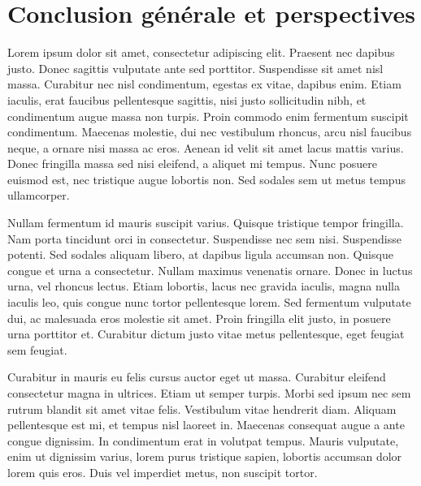 \chapter*{Conclusion générale et perspectives}




\label{chap:General Conclusion} 

Lorem ipsum dolor sit amet, consectetur adipiscing elit. Praesent nec dapibus justo. Donec sagittis vulputate ante sed porttitor. Suspendisse sit amet nisl massa. Curabitur nec nisl condimentum, egestas ex vitae, dapibus enim. Etiam iaculis, erat faucibus pellentesque sagittis, nisi justo sollicitudin nibh, et condimentum augue massa non turpis. Proin commodo enim fermentum suscipit condimentum. Maecenas molestie, dui nec vestibulum rhoncus, arcu nisl faucibus neque, a ornare nisi massa ac eros. Aenean id velit sit amet lacus mattis varius. Donec fringilla massa sed nisi eleifend, a aliquet mi tempus. Nunc posuere euismod est, nec tristique augue lobortis non. Sed sodales sem ut metus tempus ullamcorper.

Nullam fermentum id mauris suscipit varius. Quisque tristique tempor fringilla. Nam porta tincidunt orci in consectetur. Suspendisse nec sem nisi. Suspendisse potenti. Sed sodales aliquam libero, at dapibus ligula accumsan non. Quisque congue et urna a consectetur. Nullam maximus venenatis ornare. Donec in luctus urna, vel rhoncus lectus. Etiam lobortis, lacus nec gravida iaculis, magna nulla iaculis leo, quis congue nunc tortor pellentesque lorem. Sed fermentum vulputate dui, ac malesuada eros molestie sit amet. Proin fringilla elit justo, in posuere urna porttitor et. Curabitur dictum justo vitae metus pellentesque, eget feugiat sem feugiat.

Curabitur in mauris eu felis cursus auctor eget ut massa. Curabitur eleifend consectetur magna in ultrices. Etiam ut semper turpis. Morbi sed ipsum nec sem rutrum blandit sit amet vitae felis. Vestibulum vitae hendrerit diam. Aliquam pellentesque est mi, et tempus nisl laoreet in. Maecenas consequat augue a ante congue dignissim. In condimentum erat in volutpat tempus. Mauris vulputate, enim ut dignissim varius, lorem purus tristique sapien, lobortis accumsan dolor lorem quis eros. Duis vel imperdiet metus, non suscipit tortor.


